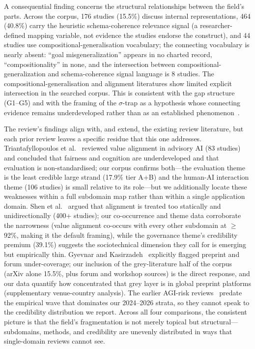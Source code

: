 A consequential finding concerns the structural relationships between the field's parts. Across the corpus, 176 studies (15.5\%) discuss internal representations, 464 (40.8\%) carry the heuristic schema-coherence relevance signal (a researcher-defined mapping variable, not evidence the studies endorse the construct), and 44 studies use compositional-generalisation vocabulary; the connecting vocabulary is nearly absent: ``goal misgeneralization'' appears in no charted record, ``compositionality'' in none, and the intersection between compositional-generalization and schema-coherence signal language is 8 studies. The compositional-generalisation and alignment literatures show limited explicit intersection in the searched corpus. This is consistent with the gap structure (G1--G5) and with the framing of the $\sigma$-trap as a hypothesis whose connecting evidence remains underdeveloped rather than as an established phenomenon~\cite{amsyar2026sigma}.

The review's findings align with, and extend, the existing review literature, but each prior review leaves a specific residue that this one addresses. Triantafyllopoulos et al.~\cite{triantafyllopoulos2026value} reviewed value alignment in advisory AI (83 studies) and concluded that fairness and cognition are underdeveloped and that evaluation is non-standardised; our corpus confirms both---the evaluation theme is the least credible large strand (17.9\% tier A+B) and the human-AI interaction theme (106 studies) is small relative to its role---but we additionally locate these weaknesses within a full subdomain map rather than within a single application domain. Shen et al.~\cite{shen2024bidirectional} argued that alignment is treated too statically and unidirectionally (400+ studies); our co-occurrence and theme data corroborate the narrowness (value alignment co-occurs with every other subdomain at $\geq$ 92\%, making it the default framing), while the governance theme's credibility premium (39.1\%) suggests the sociotechnical dimension they call for is emerging but empirically thin. Gyevnar and Kasirzadeh~\cite{gyevnar2025aisafety} explicitly flagged preprint and forum under-coverage; our inclusion of the grey-literature half of the corpus (arXiv alone 15.5\%, plus forum and workshop sources) is the direct response, and our data quantify how concentrated that grey layer is in global preprint platforms (supplementary venue-country analysis). The earlier AGI-risk reviews~\cite{hendrycks2023overview} predate the empirical wave that dominates our 2024--2026 strata, so they cannot speak to the credibility distribution we report. Across all four comparisons, the consistent picture is that the field's fragmentation is not merely topical but structural---subdomains, methods, and credibility are unevenly distributed in ways that single-domain reviews cannot see.

